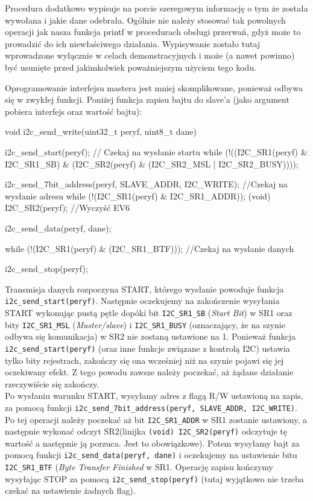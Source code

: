 \begin{ProTip}{}
Procedura dodatkowo wypisuje na porcie szeregowym informację o tym że została wywołana i jakie dane odebrała.
Ogólnie nie należy stosować tak powolnych operacji jak nasza funkcja printf w procedurach obsługi przerwań, gdyż może to prowadzić do ich niewłaściwego działania.
Wypisywanie zostało tutaj wprowadzone wyłącznie w celach demonstracyjnych i może (a nawet powinno) być usunięte przed jakimkolwiek poważniejszym użyciem tego kodu.
\end{ProTip}

Oprogramowanie interfejsu mastera jest mniej skomplikowane, ponieważ odbywa się w zwykłej funkcji. Poniżej funkcja zapisu bajtu do slave'a (jako
argument pobiera interfejs oraz wartość bajtu):

\begin{CodeFrame*}[c]{}
void i2c_send_write(uint32_t peryf, uint8_t dane){
  i2c_send_start(peryf);
  // Czekaj na wysłanie startu
  while (!((I2C_SR1(peryf) & I2C_SR1_SB)
	   & (I2C_SR2(peryf) & (I2C_SR2_MSL | I2C_SR2_BUSY))));
  
  i2c_send_7bit_address(peryf, SLAVE_ADDR, I2C_WRITE);
  //Czekaj na wysłanie adresu
  while (!(I2C_SR1(peryf) & I2C_SR1_ADDR));
  (void) I2C_SR2(peryf); //Wyczyść EV6
  
  i2c_send_data(peryf, dane);

  while (!(I2C_SR1(peryf) & (I2C_SR1_BTF))); //Czekaj na wyslanie danych

  i2c_send_stop(peryf);
}
\end{CodeFrame*}

Transmisja danych rozpoczyna START, którego wysłanie powoduje funkcja \Verb$i2c_send_start(peryf)$. Następnie oczekujemy na zakończenie wysyłania
START wykonując pustą pętle dopóki bit \Verb$I2C_SR1_SB$ (\textit{Start Bit}) w SR1 oraz bity \Verb$I2C_SR1_MSL$ (\textit{Master/slave}) i
\Verb$I2C_SR1_BUSY$ (oznaczający, że na szynie odbywa się komunikacja) w SR2 nie zostaną ustawione na 1. Ponieważ funkcja \Verb$i2c_send_start(peryf)$
(oraz inne funkcje związane z kontrolą I2C) ustawia tylko bity rejestrach, zakończy się ona wcześniej niż na szynie pojawi się jej oczekiwany
efekt. Z tego powodu zawsze należy poczekać, aż żądane działanie rzeczywiście się zakończy.\\

Po wysłaniu warunku START, wysyłamy adres z flagą R/W ustawioną na zapis, za pomocą funkcji
\Verb$i2c_send_7bit_address(peryf, SLAVE_ADDR, I2C_WRITE)$. Po tej operacji należy poczekać aż bit \Verb$I2C_SR1_ADDR$ w SR1 zostanie ustawiony, a
następnie wykonać odczyt SR2\footnotemark (linijka \Verb$(void) I2C_SR2(peryf)$ odczytuje tę wartość a następnie ją porzuca. Jest to obowiązkowe).
Potem wysyłamy bajt za pomocą funkcji \Verb$i2c_send_data(peryf, dane)$ i oczekujemy na ustawienie bitu \Verb$I2C_SR1_BTF$ (\textit{Byte Transfer
  Finished} w SR1. Operację zapisu kończymy wysyłając STOP za pomocą \Verb$i2c_send_stop(peryf)$ (tutaj wyjątkowo nie trzeba czekać na ustawienie żadnych flag).\\

